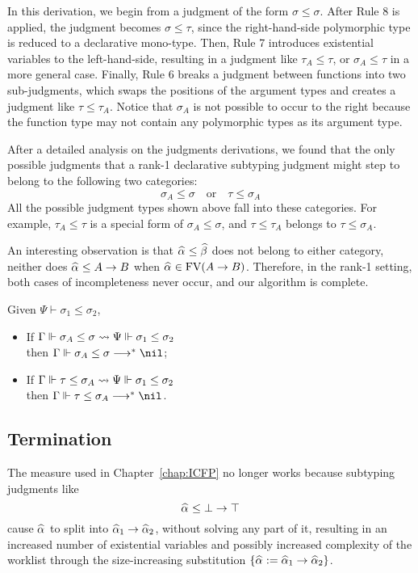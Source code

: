 In this derivation, we begin from a judgment of the form $\sigma \le \sigma$.
After Rule 8 is applied, the judgment becomes $\sigma \le \tau$,
since the right-hand-side polymorphic type is reduced to a declarative mono-type.
Then, Rule 7 introduces existential variables to the left-hand-side,
resulting in a judgment like $\tau_A \le \tau$,
or $\sigma_A \le \tau$ in a more general case.
Finally, Rule 6 breaks a judgment between functions into two sub-judgments,
which swaps the positions of the argument types
and creates a judgment like $\tau \le \tau_A$.
Notice that $\sigma_A$ is not possible to occur to the right
because the function type may not contain any polymorphic types as its argument type.

After a detailed analysis on the judgments derivations,
we found that the only possible judgments that a rank-1 declarative subtyping judgment
might step to belong to the following two categories:
$$\sigma_A \le \sigma \quad\text{or}\quad \tau \le \sigma_A$$
All the possible judgment types shown above fall into these categories.
For example, $\tau_A \le \tau$ is a special form of $\sigma_A \le \sigma$,
and $\tau \le \tau_A$ belongs to $\tau \le \sigma_A$.

An interesting observation is that $\al \le \bt$ does not belong to either category,
neither does $\al \le A \to B$ when $\al \in \text{FV}(A \to B)$.
Therefore, in the rank-1 setting, both cases of incompleteness never occur,
and our algorithm is complete.

\begin{theorem}
    Given $\Psi \vdash \sigma_1 \le \sigma_2$,
    \begin{itemize}
        \item If $\Gamma \Vdash \sigma_A \le \sigma \rightsquigarrow \Psi \Vdash \sigma_1 \le \sigma_2$
            \\then $\Gm \Vdash \sigma_A \le \sigma \redto \nil$;
        \item If $\Gamma \Vdash \tau \le \sigma_A \rightsquigarrow \Psi \Vdash \sigma_1 \le \sigma_2$
            \\then $\Gm \Vdash \tau \le \sigma_A \redto \nil$.
    \end{itemize}
\end{theorem}

\subsection{Termination}

The measure used in Chapter~\ref{chap:ICFP} no longer works because subtyping judgments like
$$\al \le \bot \to \top$$
cause $\al$ to split into $\al[1] \to \al[2]$, without solving any part of it,
resulting in an increased number of existential variables
and possibly increased complexity of the worklist through the size-increasing substitution
$\{\al := \al[1] \to \al[2]\}$.

